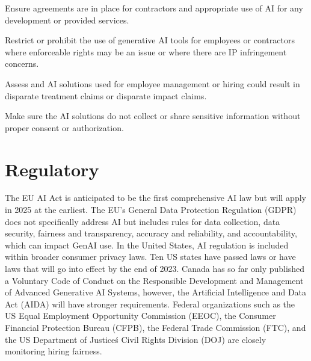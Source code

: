 \begin{minipage}{\linewidth}
\begin{checklist}
  \item Ensure agreements are in place for contractors and appropriate use of AI for any development or provided services.
  \item Restrict or prohibit the use of generative AI tools for employees or contractors where enforceable rights may be an issue or where there are IP infringement concerns.
  \item Assess and AI solutions used for employee management or hiring could result in disparate treatment claims or disparate impact claims.
  \item Make sure the AI solutions do not collect or share sensitive information without proper consent or authorization.
\end{checklist}
\end{minipage}

\clearpage

\section{Regulatory}
The EU AI Act is anticipated to be the first comprehensive AI law but will apply in 2025 at the earliest. The EU's General Data Protection Regulation (GDPR) does not specifically address AI but includes rules for data collection, data security, fairness and transparency, accuracy and reliability, and accountability, which can impact GenAI use. In the United States, AI regulation is included within broader consumer privacy laws. Ten US states have passed laws or have laws that will go into effect by the end of 2023.
Canada has so far only published a Voluntary Code of Conduct on the Responsible Development and Management of Advanced Generative AI Systems, however, the Artificial Intelligence and Data Act (AIDA) will have stronger requirements.
Federal organizations such as the US Equal Employment Opportunity Commission (EEOC), the Consumer Financial Protection Bureau (CFPB), the Federal Trade Commission (FTC), and the US Department of Justice\'s Civil Rights Division (DOJ) are closely monitoring hiring fairness.

